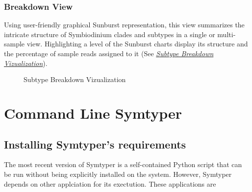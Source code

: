 \documentclass[letterpaper,10pt,english]{sphinxmanual}
\begin{document}
\subsection{Breakdown View}
\label{Web:breakdown-view}
Using user-friendly graphical Sunburst representation, this view
summarizes the intricate structure of Symbiodinium clades and subtypes
in a single or multi-sample view. Highlighting a level of the Sunburst
charts display its structure and the percentage of sample reads
assigned to it (See {\hyperref[Web:sunburst]{\emph{Subtype Breakdown Vizualization}}}).
\begin{figure}[htbp]
\centering
\capstart

\caption{Subtype Breakdown Vizualization}\label{Web:sunburst}\end{figure}


\chapter{Command Line Symtyper}
\label{CommandLine::doc}\label{CommandLine:command-line-symtyper}

\section{Installing Symtyper's requirements}
\label{CommandLine:installing-symtyper-s-requirements}
The most recent version of Symtyper is a self-contained Python script that can be run without being explicitly installed on the system.
However, Symtyper depends on other applciation for its exectution. These applications are
\end{document}
